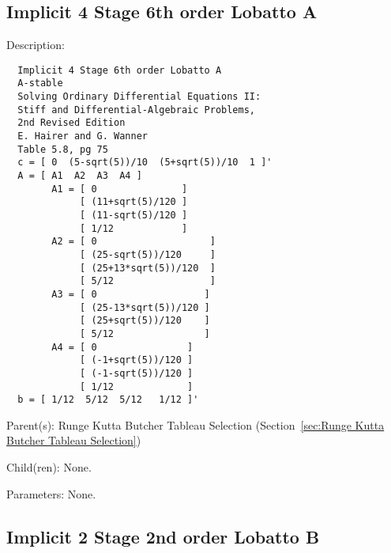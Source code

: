 \subsection{Implicit 4 Stage 6th order Lobatto A}
\label{sec:Implicit 4 Stage 6th order Lobatto A}

\begin{list}{}
  {\setlength{\leftmargin}{1.0in}
   \setlength{\labelwidth}{0.75in}
   \setlength{\labelsep}{0.125in}}
  \item[Description:]
\begin{verbatim}
  Implicit 4 Stage 6th order Lobatto A
  A-stable
  Solving Ordinary Differential Equations II:
  Stiff and Differential-Algebraic Problems,
  2nd Revised Edition
  E. Hairer and G. Wanner
  Table 5.8, pg 75
  c = [ 0  (5-sqrt(5))/10  (5+sqrt(5))/10  1 ]'
  A = [ A1  A2  A3  A4 ]
        A1 = [ 0               ]
             [ (11+sqrt(5)/120 ]
             [ (11-sqrt(5)/120 ]
             [ 1/12            ]
        A2 = [ 0                    ]
             [ (25-sqrt(5))/120     ]
             [ (25+13*sqrt(5))/120  ]
             [ 5/12                 ]
        A3 = [ 0                   ]
             [ (25-13*sqrt(5))/120 ]
             [ (25+sqrt(5))/120    ]
             [ 5/12                ]
        A4 = [ 0                ]
             [ (-1+sqrt(5))/120 ]
             [ (-1-sqrt(5))/120 ]
             [ 1/12             ]
  b = [ 1/12  5/12  5/12   1/12 ]'
\end{verbatim}
  \item[Parent(s):]
    Runge Kutta Butcher Tableau Selection (Section~\ref{sec:Runge Kutta Butcher Tableau Selection})
  \item[Child(ren):]
    None. 
  \item[Parameters:]
    None. 
\end{list}

\subsection{Implicit 2 Stage 2nd order Lobatto B}
\label{sec:Implicit 2 Stage 2nd order Lobatto B}

